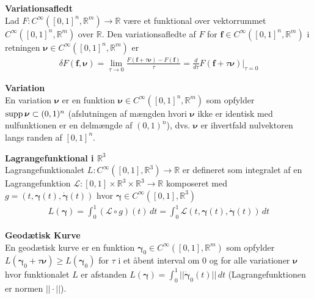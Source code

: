 
\begin{dfn} {\bf Variationsafledt}\\
Lad $F : C^\infty ([0,1]^n, \mathbb{R}^m) \to \mathbb{R}$ være et funktional over vektorrummet $C^\infty([0,1]^n, \mathbb{R}^m)$ over $\mathbb{R}$. Den variationsafledte af $F$ for $\mathbf{f}\in C^\infty ([0,1]^n, \mathbb{R}^m)$ i retningen ${\boldsymbol \nu}\in C^\infty ([0,1]^n, \mathbb{R}^m)$ er
\begin{align*}
\delta F(\mathbf{f}, {\boldsymbol \nu}) = \lim_{\tau \to 0} \frac{F(\mathbf{f}+\tau{\boldsymbol \nu})-F(\mathbf{f})}{\tau} = \frac{d}{d\tau} F(\mathbf{f}+\tau {\boldsymbol \nu}) \Big|_{\tau = 0}
\end{align*}
\end{dfn}


\begin{dfn} {\bf Variation}\\
En variation ${\boldsymbol \nu}$ er en funktion ${\boldsymbol \nu} \in C^\infty ([0,1]^n, \mathbb{R}^m)$ som opfylder $\textnormal{supp}\, {\boldsymbol \nu} \subset (0,1)^n$ (afslutningen af mængden hvori ${\boldsymbol \nu}$ ikke er identisk med nulfunktionen er en delmængde af $ (0,1)^n$), dvs. ${\boldsymbol \nu}$ er ihvertfald nulvektoren langs randen af $[0,1]^n$.
\end{dfn}


\begin{dfn} {\bf Lagrangefunktional i $\mathbb{R}^3$}\\
Lagrangefunktionalet $L : C^\infty ([0,1], \mathbb{R}^3) \to \mathbb{R}$ er defineret som integralet af en Lagrangefunktion $\mathcal{L} : [0,1] \times \mathbb{R}^3 \times \mathbb{R}^3 \to \mathbb{R}$ komposeret med $g=(t,{\boldsymbol \gamma}(t),\dot{\boldsymbol \gamma}(t))$ hvor ${\boldsymbol \gamma} \in C^\infty ([0,1], \mathbb{R}^3)$
\begin{align*}
L({\boldsymbol \gamma})= \int_0^1 (\mathcal{L}\circ g)(t) \, dt =\int_0^1 \mathcal{L}(t, {\boldsymbol \gamma}(t),\dot{{\boldsymbol \gamma}}(t)) \, dt
\end{align*}
\end{dfn}

\begin{dfn} {\bf Geodætisk Kurve}\\
En geodætisk kurve er en funktion ${\boldsymbol \gamma}_0 \in C^\infty ([0,1],\mathbb{R}^m)$ som opfylder $L({\boldsymbol \gamma}_0+\tau {\boldsymbol \nu}) \geq L({\boldsymbol \gamma}_0)$ for $\tau$ i et åbent interval om $0$ og for alle variationer ${\boldsymbol \nu}$ hvor funktionalet $L$ er afstanden $L({\boldsymbol \gamma})=\int^1_0 ||\dot{\boldsymbol \gamma}_0(t)|| \, dt$ (Lagrangefunktionen er normen $||\cdot||$).
\end{dfn}


